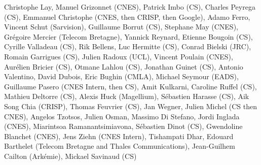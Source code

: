 Christophe Lay, Manuel Grizonnet (CNES), Patrick Imbo (CS), Charles Peyrega (CS), Emmanuel Christophe (CNES, then CRISP, then Google), Adamo Ferro, Vincent Schut (Sarvision), Guillaume Borrut (CS), Stephane May (CNES), Gr\'egoire Mercier (Telecom Bretagne), Yannick Reynard, Etienne Bougoin (CS), Cyrille Valladeau (CS), Rik Bellens, Luc Hermitte (CS), Conrad Bielski (JRC), Romain Garrigues (CS), Julien Radoux (UCL), Vincent Poulain (CNES), Aur\'elien Bricier (CS), Otmane Lahlou (CS), Jonathan Guinet (CS), Antonio Valentino, David Dubois, Eric Bughin (CMLA), Michael Seymour (EADS), Guillaume Pasero (CNES Intern, then CS), Amit Kulkarni, Caroline Ruffel (CS), Mathieu Deltorre (CS), Alexis Huck (Magellium), S\'ebastien Harasse (CS), Aik Song Chia (CRISP), Thomas Feuvrier (CS), Jan Wegner, Julien Michel (CS then CNES), Angelos Tzotsos, Julien Osman, Massimo Di Stefano, Jordi Inglada (CNES), Miarintsoa Ramanantsimiavona, S\'ebastien Dinot (CS), Gwendoline Blanchet (CNES), Jens Ziehn (CNES Intern), Tishampati Dhar, Edouard Barthelet (Telecom Bretagne and Thales Communications), Jean-Guilhem Cailton (Ark\'emie), Mickael Savinaud (CS)